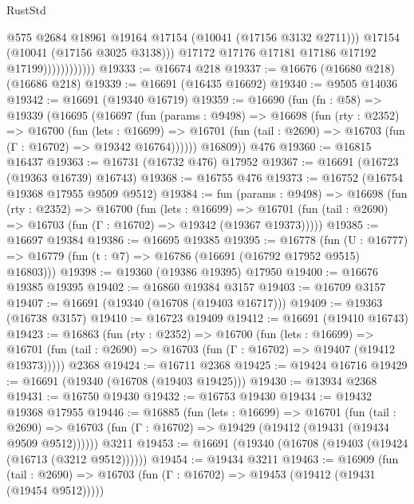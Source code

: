 \begin{lexlean}{RustStd}
\begin{coremodule}
                                @575
                                @2684
                                @18961
                                @19164
                                @17154
                                (@10041 (@17156 @3132 @2711)))
                              @17154
                              (@10041 (@17156 @3025 @3138)))
                            @17172
                            @17176
                            @17181
                            @17186
                            @17192
                            @17199))))))))))))
@19333 := @16674 @218
@19337 := @16676 (@16680 @218) (@16686 @218)
@19339 := @16691 (@16435 @16692)
@19340 := @9505 @14036
@19342 := @16691 (@19340 @16719)
@19359 := @16690
    (fun (fn : @58) =>
    @19339
      (@16695
        (@16697
          (fun (params : @9498) =>
          @16698
            (fun (rty : @2352) =>
            @16700
              (fun (lets : @16699) =>
              @16701 (fun (tail : @2690) => @16703 (fun (Γ : @16702) => @19342 @16764))))))
        @16809))
    @476
@19360 := @16815 @16437
@19363 := @16731 (@16732 @476) @17952
@19367 := @16691 (@16723 (@19363 @16739) @16743)
@19368 := @16755 @476
@19373 := @16752 (@16754 @19368 @17955 @9509 @9512)
@19384 := fun (params : @9498) =>
  @16698
    (fun (rty : @2352) =>
    @16700
      (fun (lets : @16699) =>
      @16701 (fun (tail : @2690) => @16703 (fun (Γ : @16702) => @19342 (@19367 @19373)))))
@19385 := @16697 @19384
@19386 := @16695 @19385
@19395 := @16778
    (fun (U : @16777) => @16779 (fun (t : @7) => @16786 (@16691 (@16792 @17952 @9515) @16803)))
@19398 := @19360 (@19386 @19395) @17950
@19400 := @16676 @19385 @19395
@19402 := @16860 @19384 @3157
@19403 := @16709 @3157
@19407 := @16691 (@19340 (@16708 (@19403 @16717)))
@19409 := @19363 (@16738 @3157)
@19410 := @16723 @19409
@19412 := @16691 (@19410 @16743)
@19423 := @16863
    (fun (rty : @2352) =>
    @16700
      (fun (lets : @16699) =>
      @16701 (fun (tail : @2690) => @16703 (fun (Γ : @16702) => @19407 (@19412 @19373)))))
    @2368
@19424 := @16711 @2368
@19425 := @19424 @16716
@19429 := @16691 (@19340 (@16708 (@19403 @19425)))
@19430 := @13934 @2368
@19431 := @16750 @19430
@19432 := @16753 @19430
@19434 := @19432 @19368 @17955
@19446 := @16885
    (fun (lets : @16699) =>
    @16701
      (fun (tail : @2690) =>
      @16703 (fun (Γ : @16702) => @19429 (@19412 (@19431 (@19434 @9509 @9512))))))
    @3211
@19453 := @16691 (@19340 (@16708 (@19403 (@19424 (@16713 (@3212 @9512))))))
@19454 := @19434 @3211
@19463 := @16909
    (fun (tail : @2690) => @16703 (fun (Γ : @16702) => @19453 (@19412 (@19431 (@19454 @9512)))))

\end{coremodule}
\end{lexlean}
